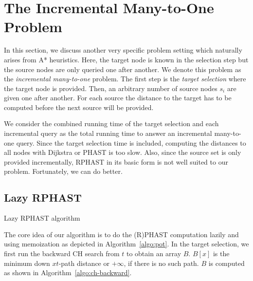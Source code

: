 \documentclass[manuscript,review]{acmart}
\begin{document}
\section{The Incremental Many-to-One Problem}\label{sec:lazy-rphast}

In this section, we discuss another very specific problem setting which naturally arises from A* heuristics.
Here, the target node is known in the selection step but the source nodes are only queried one after another.
We denote this problem as the \emph{incremental many-to-one} problem.
The first step is the \emph{target selection} where the target node is provided.
Then, an arbitrary number of source nodes $s_i$ are given one after another.
For each source the distance to the target has to be computed before the next source will be provided.

We consider the combined running time of the target selection and each incremental query as the total running time to answer an incremental many-to-one query.
Since the target selection time is included, computing the distances to all nodes with Dijkstra or PHAST is too slow.
Also, since the source set is only provided incrementally, RPHAST in its basic form is not well suited to our problem.
Fortunately, we can do better.

\subsection{Lazy RPHAST}

\begin{algorithm2e}
\caption{Lazy RPHAST algorithm}
\label{algo:pot}
\end{algorithm2e}

The core idea of our algorithm is to do the (R)PHAST computation lazily and using memoization as depicted in Algorithm~\ref{algo:pot}.
In the target selection, we first run the backward CH search from $t$ to obtain an array $B$.
$B[x]$ is the minimum down $xt$-path distance or $+\infty$, if there is no such path.
$B$ is computed as shown in Algorithm~\ref{algo:ch-backward}.
\end{document}
